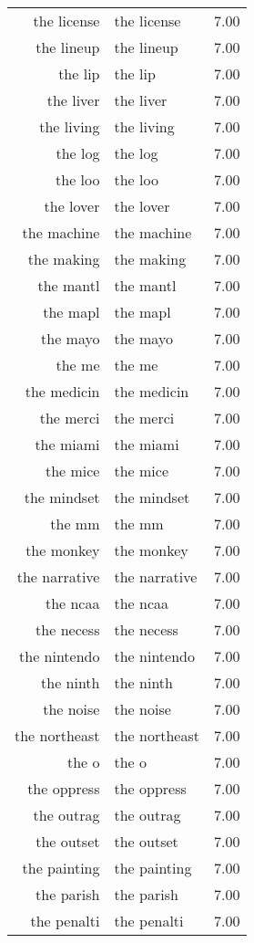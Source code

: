 \begin{table}[ht]
\begin{tabular}{rlr}
  the license & the license & 7.00 \\ 
  the lineup & the lineup & 7.00 \\ 
  the lip & the lip & 7.00 \\ 
  the liver & the liver & 7.00 \\ 
  the living & the living & 7.00 \\ 
  the log & the log & 7.00 \\ 
  the loo & the loo & 7.00 \\ 
  the lover & the lover & 7.00 \\ 
  the machine & the machine & 7.00 \\ 
  the making & the making & 7.00 \\ 
  the mantl & the mantl & 7.00 \\ 
  the mapl & the mapl & 7.00 \\ 
  the mayo & the mayo & 7.00 \\ 
  the me & the me & 7.00 \\ 
  the medicin & the medicin & 7.00 \\ 
  the merci & the merci & 7.00 \\ 
  the miami & the miami & 7.00 \\ 
  the mice & the mice & 7.00 \\ 
  the mindset & the mindset & 7.00 \\ 
  the mm & the mm & 7.00 \\ 
  the monkey & the monkey & 7.00 \\ 
  the narrative & the narrative & 7.00 \\ 
  the ncaa & the ncaa & 7.00 \\ 
  the necess & the necess & 7.00 \\ 
  the nintendo & the nintendo & 7.00 \\ 
  the ninth & the ninth & 7.00 \\ 
  the noise & the noise & 7.00 \\ 
  the northeast & the northeast & 7.00 \\ 
  the o & the o & 7.00 \\ 
  the oppress & the oppress & 7.00 \\ 
  the outrag & the outrag & 7.00 \\ 
  the outset & the outset & 7.00 \\ 
  the painting & the painting & 7.00 \\ 
  the parish & the parish & 7.00 \\ 
  the penalti & the penalti & 7.00 \\ 

\end{tabular}
\end{table}
